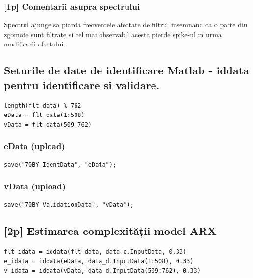 \documentclass[12pt,english]{article}
\begin{document}
\subsubsection {[1p] Comentarii asupra spectrului }
Spectrul ajunge sa piarda frecventele afectate de filtru, insemnand ca o parte din zgomote sunt filtrate si cel mai observabil acesta pierde spike-ul in urma modificarii ofsetului.
\subsection {Seturile de date de identificare Matlab - iddata pentru identificare si validare. }
\begin{lstlisting}
length(flt_data) % 762
eData = flt_data(1:508)
vData = flt_data(509:762)
\end{lstlisting}

\subsubsection {eData  (upload) }
\begin{lstlisting}
save("70BY_IdentData", "eData");
\end{lstlisting}
\subsubsection {vData  (upload) }
\begin{lstlisting}
save("70BY_ValidationData", "vData");
\end{lstlisting}
\subsection {[2p] Estimarea complexității model ARX }
\begin{lstlisting}
flt_idata = iddata(flt_data, data_d.InputData, 0.33)
e_idata = iddata(eData, data_d.InputData(1:508), 0.33)
v_idata = iddata(vData, data_d.InputData(509:762), 0.33)
\end{lstlisting}
\end{document}
